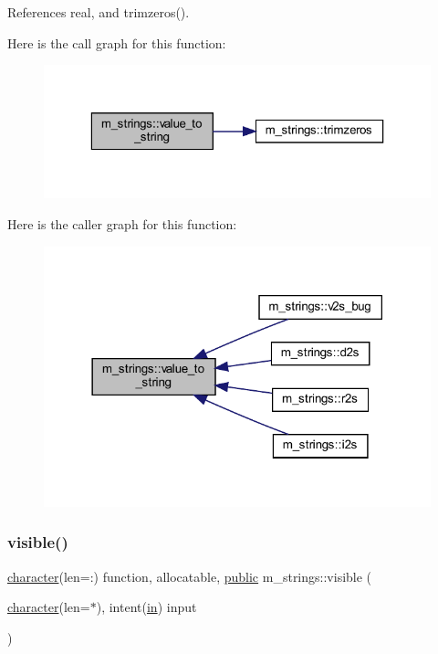 References real, and trimzeros().

Here is the call graph for this function\+:
\nopagebreak
\begin{figure}[H]
\begin{center}
\leavevmode
\includegraphics[width=323pt]{namespacem__strings_a58d30b135c367184a666f8b4baaa64b5_cgraph}
\end{center}
\end{figure}
Here is the caller graph for this function\+:
\nopagebreak
\begin{figure}[H]
\begin{center}
\leavevmode
\includegraphics[width=318pt]{namespacem__strings_a58d30b135c367184a666f8b4baaa64b5_icgraph}
\end{center}
\end{figure}
\mbox{\label{namespacem__strings_a791e24ceb690010fd42a6c1f48311b55}} 
\subsubsection{\texorpdfstring{visible()}{visible()}}
{\footnotesize\ttfamily \hyperlink{option__stopwatch_83_8txt_abd4b21fbbd175834027b5224bfe97e66}{character}(len=\+:) function, allocatable, \hyperlink{M__stopwatch_83_8txt_a2f74811300c361e53b430611a7d1769f}{public} m\+\_\+strings\+::visible (\begin{DoxyParamCaption}\item[{\hyperlink{option__stopwatch_83_8txt_abd4b21fbbd175834027b5224bfe97e66}{character}(len=$\ast$), intent(\hyperlink{M__journal_83_8txt_afce72651d1eed785a2132bee863b2f38}{in})}]{input }\end{DoxyParamCaption})}



